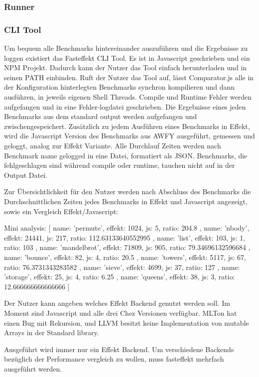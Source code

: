 \subsubsection{ Runner }
\subsubsection{ CLI Tool }
  
Um bequem alle Benchmarks hintereinander auszuführen und die Ergebnisse zu loggen existiert das Fasteffekt CLI Tool.
Es ist in Javascript geschrieben und ein NPM Projekt. Dadurch kann der Nutzer das Tool einfach herunterladen und in seinen PATH einbinden.
Ruft der Nutzer das Tool auf, lässt Comparator.js alle in der Konfiguration hinterlegten Benchmarks synchron kompilieren und dann ausführen, in jeweils eigenen Shell Threads. Compile und Runtime Fehler werden aufgefangen und in eine Fehler-logdatei geschrieben. Die Ergebnisse eines jeden Benchmarks aus dem standard output werden aufgefangen und zwischengespeichert.
Zusätzlich zu jedem Ausführen eines Benchmarks in Effekt, wird die Javascript Version des Benchmarks aus AWFY ausgeführt, gemessen und geloggt, analog zur Effekt Variante.
Alle Durchlauf Zeiten werden nach Benchmark name gelogged in eine Datei, formatiert als JSON.
Benchmarks, die fehlgeschlagen sind während compile oder runtime, tauchen nicht auf in der Output Datei.

Zur Übersichtlichkeit für den Nutzer werden nach Abschluss des Benchmarks die Durchschnittlichen Zeiten jedes Benchmarks in Effekt und Javascript angezeigt, sowie ein Vergleich Effekt/Javascript:

Mini analysis: [
{ name: 'permute', effekt: 1024, js: 5, ratio: 204.8 },
{ name: 'nbody', effekt: 24441, js: 217, ratio: 112.63133640552995 },
{ name: 'list', effekt: 103, js: 1, ratio: 103 },
{
name: 'mandelbrot',
effekt: 71809,
js: 905,
ratio: 79.34696132596684
},
{ name: 'bounce', effekt: 82, js: 4, ratio: 20.5 },
{ name: 'towers', effekt: 5117, js: 67, ratio: 76.3731343283582 },
{ name: 'sieve', effekt: 4699, js: 37, ratio: 127 },
{ name: 'storage', effekt: 25, js: 4, ratio: 6.25 },
{ name: 'queens', effekt: 38, js: 3, ratio: 12.666666666666666 }
] 

Der Nutzer kann angeben welches Effekt Backend genutzt werden soll. Im Moment sind Javascript und alle drei Chez Versionen verfügbar.
MLTon hat einen Bug mit Rekursion, und LLVM besitzt keine Implementation von mutable Arrays in der Standard library.

Ausgeführt wird immer nur ein Effekt Backend. Um verschiedene Backends bezüglich der Performance vergleich zu wollen, muss fasteffekt mehrfach ausgeführt werden.  

